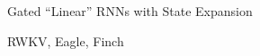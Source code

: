 \begin{slidewhite}[\slideopts,toc={HGRN2}]{Gated ``Linear'' RNNs with State Expansion}
\vspace{-6em}
\end{slidewhite}

\begin{slidewhite}[\slideopts,toc={RWKV+}]{RWKV, Eagle, Finch}
\vspace{-6em}
\end{slidewhite}


%
%
%
%


\endinput
